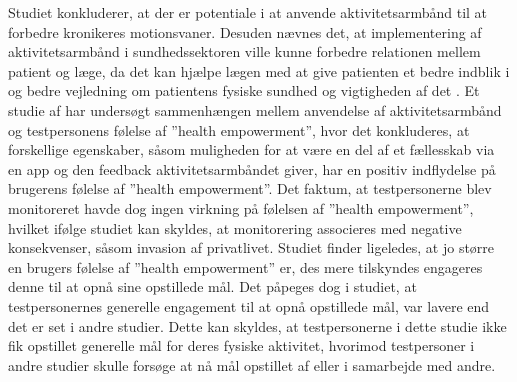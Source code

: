 Studiet konkluderer, at der er potentiale i at anvende aktivitetsarmbånd til at forbedre kronikeres motionsvaner. Desuden nævnes det, at implementering af aktivitetsarmbånd i sundhedssektoren ville kunne forbedre relationen mellem patient og læge, da det kan hjælpe lægen med at give patienten et bedre indblik i og bedre vejledning om patientens fysiske sundhed og vigtigheden af det \citep{mercer2016}. 
Et studie af \citep{nelson2016} har undersøgt sammenhængen mellem anvendelse af aktivitetsarmbånd og testpersonens følelse af ”health empowerment”, hvor det konkluderes, at forskellige egenskaber, såsom muligheden for at være en del af et fællesskab via en app og den feedback aktivitetsarmbåndet giver, har en positiv indflydelse på brugerens følelse af ”health empowerment”. Det faktum, at testpersonerne blev monitoreret havde dog ingen virkning på følelsen af ”health empowerment”, hvilket ifølge studiet kan skyldes, at monitorering associeres med negative konsekvenser, såsom invasion af privatlivet.
Studiet finder ligeledes, at jo større en brugers følelse af ”health empowerment” er, des mere tilskyndes engageres denne til at opnå sine opstillede mål. Det påpeges dog i studiet, at testpersonernes generelle engagement til at opnå opstillede mål, var lavere end det er set i andre studier. Dette kan skyldes, at testpersonerne i dette studie ikke fik opstillet generelle mål for deres fysiske aktivitet, hvorimod testpersoner i andre studier skulle forsøge at nå mål opstillet af eller i samarbejde med andre. 


